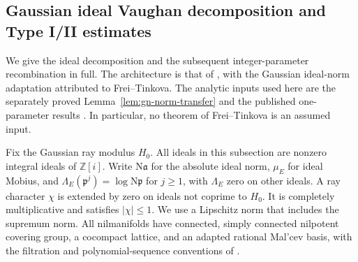 \documentclass[11pt]{article}
\theoremstyle{definition}
\theoremstyle{remark}
\begin{document}
\subsection{Gaussian ideal Vaughan decomposition and Type I/II estimates}
\label{gi-section}

We give the ideal decomposition and the subsequent integer-parameter
recombination in full.  The architecture is that of
\cite[Section~3]{moebius}, with the Gaussian ideal-norm adaptation
attributed to Frei--Tinkova.  The analytic inputs used here are the
separately proved Lemma~\ref{lem:gn-norm-transfer} and the published
one-parameter results \cite[Theorem~2.9 and Lemma~4.5]{GTOrbits2012}.
In particular, no theorem of Frei--Tinkova is an assumed input.

Fix the Gaussian ray modulus $H_0$.  All ideals in this subsection are
nonzero integral ideals of $\mathbb Z[i]$.  Write $\mathrm N\mathfrak a$
for the absolute ideal norm, $\mu_E$ for ideal Mobius, and
$\Lambda_E(\mathfrak p^j)=\log\mathrm N\mathfrak p$ for $j\geq1$, with
$\Lambda_E$ zero on other ideals.  A ray character $\chi$ is extended by
zero on ideals not coprime to $H_0$.  It is completely multiplicative
and satisfies $|\chi|\leq1$.  We use a Lipschitz norm that includes the
supremum norm.  All nilmanifolds have connected, simply connected
nilpotent covering group, a cocompact lattice, and an adapted rational
Mal'cev basis, with the filtration and polynomial-sequence conventions
of \cite{GTOrbits2012}.
\end{document}
